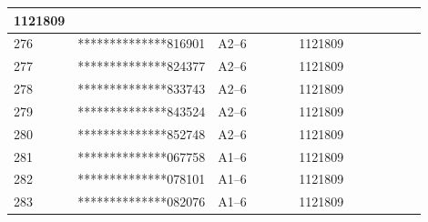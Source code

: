 \documentclass[UTF8,10pt,a4paper,fontset=fandol]{ctexart}
\newcommand{\fieldvalue}[1]{#1}
\begin{document}
\begin{center}
\begin{tabular}{|p{0.07\linewidth}|p{0.27\linewidth}|p{0.22\linewidth}|p{0.18\linewidth}|p{0.16\linewidth}|}
\fieldvalue{1121809} & \\ \hline
276 &
\fieldvalue{**************816901} &
\fieldvalue{A2--6} &
\fieldvalue{1121809} & \\ \hline
277 &
\fieldvalue{**************824377} &
\fieldvalue{A2--6} &
\fieldvalue{1121809} & \\ \hline
278 &
\fieldvalue{**************833743} &
\fieldvalue{A2--6} &
\fieldvalue{1121809} & \\ \hline
279 &
\fieldvalue{**************843524} &
\fieldvalue{A2--6} &
\fieldvalue{1121809} & \\ \hline
280 &
\fieldvalue{**************852748} &
\fieldvalue{A2--6} &
\fieldvalue{1121809} & \\ \hline
281 &
\fieldvalue{**************067758} &
\fieldvalue{A1--6} &
\fieldvalue{1121809} & \\ \hline
282 &
\fieldvalue{**************078101} &
\fieldvalue{A1--6} &
\fieldvalue{1121809} & \\ \hline
283 &
\fieldvalue{**************082076} &
\fieldvalue{A1--6} &
\fieldvalue{1121809} & \\ \hline

\end{tabular}
\end{center}
\end{document}
